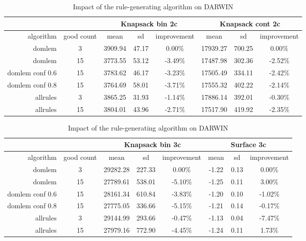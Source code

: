 \begin{table}[htb]
  \centering
  \begin{tabular}{r c c c c c c c}
    & & \multicolumn{3}{c}{Knapsack bin 2c} & \multicolumn{3}{c}{Knapsack cont 2c} \\
    \hline
    algorithm & good count & mean & sd & improvement & mean & sd & improvement \\
    \hline
    \hline
domlem & 3 & 3909.94 & 47.17 & 0.00\% & 17939.27 & 700.25 & 0.00\% \\
domlem & 15 & 3773.55 & 53.12 & -3.49\% & 17487.98 & 302.36 & -2.52\% \\
domlem conf 0.6 & 15 & 3783.62 & 46.17 & -3.23\% & 17505.49 & 334.11 & -2.42\% \\
domlem conf 0.8 & 15 & 3764.69 & 58.01 & -3.71\% & 17555.32 & 402.22 & -2.14\% \\
allrules & 3 & 3865.25 & 31.93 & -1.14\% & 17886.14 & 392.01 & -0.30\% \\
allrules & 15 & 3804.01 & 43.96 & -2.71\% & 17517.90 & 419.92 & -2.35\% \\
    \hline
  \end{tabular}
  \caption{Impact of the rule-generating algorithm on DARWIN}
  \label{t:algo_1a}
\end{table}


\begin{table}[htb]
  \centering
  \begin{tabular}{r c c c c c c c}
    & & \multicolumn{3}{c}{Knapsack bin 3c} & \multicolumn{3}{c}{Surface 3c} \\
    \hline
    algorithm & good count & mean & sd & improvement & mean & sd & improvement \\
    \hline
    \hline
domlem & 3 & 29282.28 & 227.33 & 0.00\% & -1.22 & 0.13 & 0.00\% \\
domlem & 15 & 27789.61 & 538.01 & -5.10\% & -1.25 & 0.11 & 3.00\% \\
domlem conf 0.6 & 15 & 28161.34 & 610.84 & -3.83\% & -1.20 & 0.10 & -1.02\% \\
domlem conf 0.8 & 15 & 27775.05 & 336.66 & -5.15\% & -1.21 & 0.14 & -0.17\% \\
allrules & 3 & 29144.99 & 293.66 & -0.47\% & -1.13 & 0.04 & -7.47\% \\
allrules & 15 & 27979.16 & 772.90 & -4.45\% & -1.24 & 0.11 & 1.73\% \\
    \hline
  \end{tabular}
  \caption{Impact of the rule-generating algorithm on DARWIN}
  \label{t:algo_1b}
\end{table}



